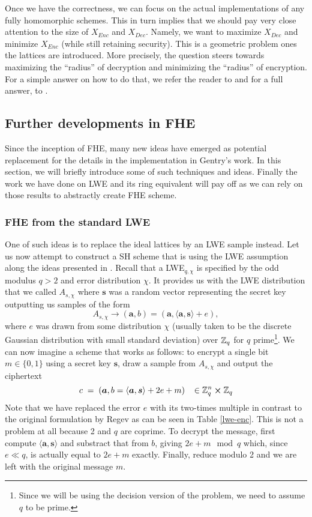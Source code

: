 Once we have the correctness, we can focus on the actual implementations of any fully homomorphic schemes. This in turn implies that we should pay very close attention to the size of $X_{Enc}$ and $X_{Dec}$. Namely, we want to maximize $X_{Dec}$ and minimize $X_{Enc}$ (while still retaining security). This is a geometric problem ones the lattices are introduced. More precisely, the question steers towards maximizing the ``radius'' of decryption and minimizing the ``radius'' of encryption. For a simple answer on how to do that, we refer the reader to \cite{gentry} and for a full answer, to \cite{gentry_phd}. %

\subsection{Further developments in FHE}
Since the inception of FHE, many new ideas have emerged as potential replacement for the details in the implementation in Gentry's work. In this section, we will briefly introduce some of such techniques and ideas. Finally the work we have done on LWE and its ring equivalent will pay off as we can rely on those results to abstractly create FHE scheme.

\subsubsection{FHE from the standard LWE}
 One of such ideas is to replace the ideal lattices by an LWE sample instead. Let us now attempt to construct a SH scheme that is using the LWE assumption along the ideas presented in \cite{fhe-lwe}. Recall that a LWE$_{q, \chi}$ is specified by the odd modulus $q > 2$ and error distribution $\chi$. It provides us with the LWE distribution that we called $A_{s, \chi}$ where $\bm{s}$ was a random vector representing the secret key outputting us samples of the form
\[A_{s, \chi} \rightarrow (\bm{a}, b) = (\bm{a}, \langle \bm{a}, \bm{s} \rangle + e),\]
where $e$ was drawn from some distribution $\chi$ (usually taken to be the discrete Gaussian distribution with small standard deviation) over $\mathbb{Z}_q$ for $q$ prime\footnote{Since we will be using the decision version of the problem, we need to assume $q$ to be prime.}. We can now imagine a scheme that works as follows: to encrypt a single bit $m \in \{0,1\}$ using a secret key $\bm{s}$, draw a sample from $A_{s, \chi}$ and output the ciphertext
\[ c \; = \; (\boldsymbol{a}, b = \langle \boldsymbol{a}, \boldsymbol{s} \rangle +2e +m) \; \; \; \in \mathbb{Z}_q^n \cross \mathbb{Z}_q \]
Note that we have replaced the error $e$ with its two-times multiple in contrast to the original formulation by Regev as can be seen in Table \ref{lwe-enc}. This is not a problem at all because 2 and $q$ are coprime. To decrypt the message, first compute $\langle \bm{a},\bm{s} \rangle$ and substract that from $b$, giving $2e + m \mod q$ which, since $e \ll q$, is actually equal to $2e +m$ exactly. Finally, reduce modulo 2 and we are left with the original message $m$.

